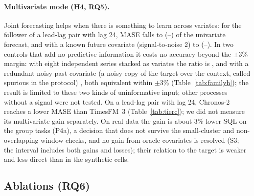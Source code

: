 \paragraph{Multivariate mode (H4, RQ5).} Joint forecasting helps when there is something to learn across variates: for the
follower of a lead-lag pair with lag 24, MASE falls to \Hfoura{} (\HfouraLo--\HfouraHi) of the univariate forecast, and with a known
future covariate (signal-to-noise 2) to \Hfourb{} (\HfourbLo--\HfourbHi). In two controls that add no predictive information it costs no accuracy
beyond the $\pm$3\% margin: with eight independent series stacked as variates the ratio is \Hfourc{}, and with a redundant noisy
past covariate (a noisy copy of the target over the context, called spurious in the protocol) \Hfourd{}, both equivalent within $\pm$3\% (Table~\ref{tab:familyh}); the result is limited to these two kinds of uninformative input; other processes without a signal were not tested. On a lead-lag pair with lag 24, Chronos-2 reaches a lower MASE than
TimesFM~3 (Table~\ref{tab:tierc}); we did not measure its multivariate gain separately. On real data the gain is about 3\% lower SQL on the group tasks (P4a), a decision that does not survive the small-cluster and
non-overlapping-window checks, and no gain from oracle covariates is resolved (S3; the interval includes both gains and losses);
their relation to the target is weaker and less direct than in the synthetic cells.

\begin{table}[!htbp]
\centering
\caption{Family H: primary tests of the pre-declared hypotheses (Holm over seven tests). H4c and H4d are equivalence tests with a
$\pm$3\% margin (two one-sided tests): for them the table gives the 90\% interval (marked $^{90}$), and $p_{\mathrm{Holm}}$ adjusts the TOST $p$; H5 is a
non-superiority test with floor 0.90 and a one-sided $p$. H3 is uninformative: its cell never activates the mechanism it tests
(ratio exactly 1). Ratios to four decimals.}
\label{tab:familyh}
\scriptsize
\setlength{\tabcolsep}{3pt}

\end{table}

\subsection{Ablations (RQ6)}
\label{sec:ablations}

